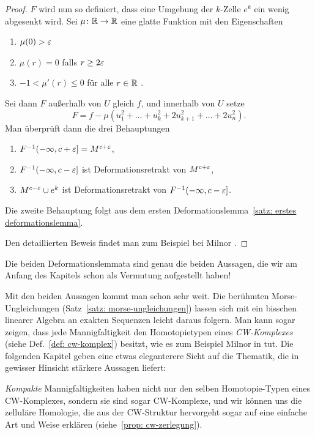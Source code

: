 \begin{proof}
    $F$ wird nun so definiert, dass eine Umgebung der $k$-Zelle $e^k$ ein wenig abgesenkt wird.
    Sei $\mu \colon { \mathbb R } \to { \mathbb R }$ eine glatte Funktion mit den Eigenschaften
    \begin{enumerate}
        \item $\mu(0) > \varepsilon$
        \item $\mu (r) = 0$ falls $r \geq 2 \varepsilon$
        \item $-1 < \mu' (r) \leq 0$ für alle $r \in { \mathbb R }$ .
    \end{enumerate}
    Sei dann $F$ außerhalb von $U$ gleich $f$, und innerhalb von $U$ setze
    \[ F = f - \mu ( u_1^2 + \dots + u_k^2 + 2 u_{k + 1}^2 + \dots + 2 u_n^2) . \]
    Man überprüft dann die drei Behauptungen
    \begin{enumerate}
        \item $F^{-1}(- \infty, c + \varepsilon] = M^{c + \varepsilon}$,
        \item $F^{-1}(- \infty, c - \varepsilon]$ ist Deformationsretrakt von $M^{c + \varepsilon}$,
        \item $M^{c - \varepsilon} \cup e^k$ ist Deformationsretrakt von $F^{-1}(- \infty, c - \varepsilon]$.
    \end{enumerate}
    Die zweite Behauptung folgt aus dem ersten 
    Deformationslemma~\ref{satz: erstes deformationslemma}.
    
    Den detaillierten Beweis findet man zum Beispiel bei Milnor \cite{milnor}.
\end{proof}

Die beiden Deformationslemmata sind genau die beiden Aussagen, die wir am Anfang des Kapitels schon
als Vermutung aufgestellt haben!

Mit den beiden Aussagen kommt man schon sehr weit. Die berühmten Morse-\-Un\-glei\-chun\-gen 
(Satz~\ref{satz: morse-ungleichungen}) lassen
sich mit ein bisschen linearer Algebra an exakten Sequenzen leicht daraus folgern. Man kann sogar
zeigen, dass jede Mannigfaltigkeit den Homotopietypen eines \textit{CW-Komplexes}
(siehe Def.~\ref{def: cw-komplex}) besitzt, wie es zum Beispiel Milnor  in \cite{milnor} tut. Die 
folgenden Kapitel geben eine etwas eleganterere Sicht auf die Thematik, die in gewisser Hinsicht 
stärkere Aussagen liefert:

\textit{Kompakte} Mannigfaltigkeiten haben nicht nur den selben Homotopie-Typen eines CW-Komplexes, 
sondern sie sind sogar CW-Komplexe, und wir können uns die zelluläre Homologie, die aus der 
CW-Struktur hervorgeht sogar auf eine einfache Art und Weise erklären 
(siehe~\ref{prop: cw-zerlegung}).